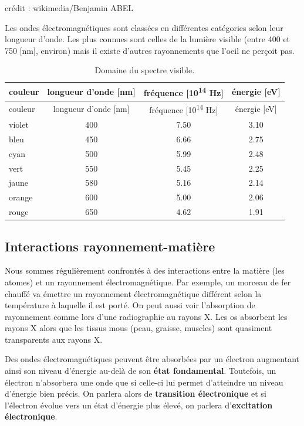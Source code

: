 \documentclass[
  11pt,
  french,
  a4paper,
  openany]{book}
\newenvironment{credit}
  {\vspace{-2em}\begin{center}\begin{footnotesize}\begin{textit}}
  {\end{textit}\end{footnotesize}\end{center}}
\begin{document}
\begin{credit}
crédit : wikimedia/Benjamin ABEL

\end{credit}

Les ondes électromagnétiques sont classées en différentes catégories selon leur longueur d'onde. Les plus connues sont celles de la lumière visible (entre 400 et 750 {[}nm{]}, environ) mais il existe d'autres rayonnements que l'oeil ne perçoit pas.

\begin{longtable}[]{@{}lccc@{}}
\caption{\label{tab:domaine-spectre-visible} Domaine du spectre visible.}\tabularnewline
\toprule
couleur & longueur d'onde {[}nm{]} & fréquence {[}10\textsuperscript{14} Hz{]} & énergie {[}eV{]}\tabularnewline
\midrule
\endfirsthead
\toprule
couleur & longueur d'onde {[}nm{]} & fréquence {[}10\textsuperscript{14} Hz{]} & énergie {[}eV{]}\tabularnewline
\midrule
\endhead
violet & 400 & 7.50 & 3.10\tabularnewline
bleu & 450 & 6.66 & 2.75\tabularnewline
cyan & 500 & 5.99 & 2.48\tabularnewline
vert & 550 & 5.45 & 2.25\tabularnewline
jaune & 580 & 5.16 & 2.14\tabularnewline
orange & 600 & 5.00 & 2.06\tabularnewline
rouge & 650 & 4.62 & 1.91\tabularnewline
\bottomrule
\end{longtable}

\hypertarget{interactions-rayonnement-matiuxe8re-1}{%
\subsection{Interactions rayonnement-matière}\label{interactions-rayonnement-matiuxe8re-1}}

Nous sommes régulièrement confrontés à des interactions entre la matière (les atomes) et un rayonnement électromagnétique. Par exemple, un morceau de fer chauffé va émettre un rayonnement électromagnétique différent selon la température à laquelle il est porté. On peut aussi voir l'absorption de rayonnement comme lors d'une radiographie au rayons X. Les os absorbent les rayons X alors que les tissus mous (peau, graisse, muscles) sont quasiment transparents aux rayons X.

Des ondes électromagnétiques peuvent être absorbées par un électron augmentant ainsi son niveau d'énergie au-delà de son \textbf{état fondamental}. Toutefois, un électron n'absorbera une onde que si celle-ci lui permet d'atteindre un niveau d'énergie bien précis. On parlera alors de \textbf{transition électronique} et si l'électron évolue vers un état d'énergie plus élevé, on parlera d'\textbf{excitation électronique}.
\end{document}
